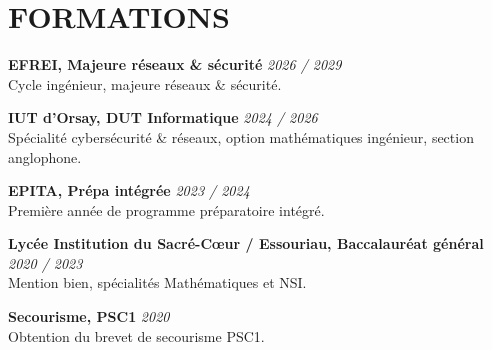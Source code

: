 \documentclass[10pt,a4paper]{article}
\newcommand{\entry}[3]{%
  \textbf{#1} \hfill \textit{\small #2}\\
  \small #3\par\vspace{8pt}
}
\begin{document}
\begin{minipage}[t]{0.67\linewidth}
\section*{FORMATIONS}

\entry{EFREI, Majeure réseaux \& sécurité}{2026 / 2029}{Cycle ingénieur, majeure réseaux \& sécurité.}

\entry{IUT d'Orsay, DUT Informatique}{2024 / 2026}{Spécialité cybersécurité \& réseaux, option mathématiques ingénieur, section anglophone.}

\entry{EPITA, Prépa intégrée}{2023 / 2024}{Première année de programme préparatoire intégré.}

\entry{Lycée Institution du Sacré-Cœur / Essouriau, Baccalauréat général}{2020 / 2023}{Mention bien, spécialités Mathématiques et NSI.}

\entry{Secourisme, PSC1}{2020}{Obtention du brevet de secourisme PSC1.}

\end{minipage}
\end{document}
